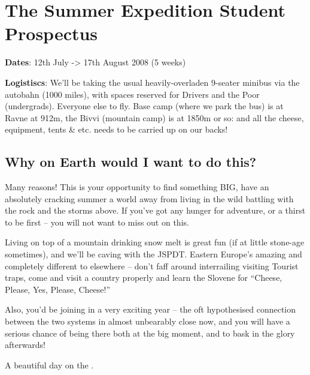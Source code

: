 \section{The Summer Expedition Student Prospectus}

\textbf{Dates}: 12th July -> 17th August 2008 (5 weeks)


\textbf{Logistiscs}: We'll be taking the usual heavily-overladen 9-seater
minibus via the autobahn (1000 miles), with spaces reserved for
Drivers and the Poor (undergrads). Everyone else to fly.
Base camp (where we park the bus) is at Ravne at 912m, the
Bivvi (mountain camp) is at 1850m or so: and all the cheese,
equipment, tents \& etc. needs to be carried up on our backs!

\subsection{Why on Earth would I want to do this?}

Many reasons! This is your opportunity to find something BIG, have an absolutely cracking summer a world away from  living in the wild battling with the rock and the storms above. If you've got any hunger for adventure, or a thirst to be first – you will not want to miss out on this.

Living on top of a mountain drinking snow melt is great fun (if at little stone-age sometimes), and we'll be
caving with the JSPDT. Eastern Europe's amazing and completely different to elsewhere – don't faff around
interrailing visiting Tourist traps, come and visit a country properly and learn the Slovene for “Cheese, Please, Yes, Please, Cheese!”

Also, you'd be joining in a very exciting year – the oft hypothesised connection between the two systems in almost unbearably close now, and you will have a serious chance of being there both at the big moment, and to bask in the glory afterwards!

\begin{pagefigure}
\checkoddpage \ifoddpage \forcerectofloat \else \forceversofloat \fi
\centering
{}
\caption{A beautiful day on the . } \label{tents}
\end{pagefigure}